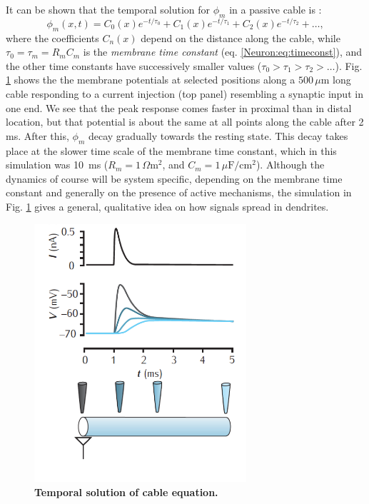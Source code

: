 \subsubsection{}
\label{sec:Neuron:cabletemp}
It can be shown that the temporal solution for $\phi_m$ in a passive cable is \cite{rall1969}:
\begin{equation}
\phi_m(x,t) = C_0(x) e^{-t/\tau_0} + C_1(x) e^{-t/\tau_1} + C_2(x) e^{-t/\tau_2} + \ldots, 
\label{Neuron:eq:cabletemporal}
\end{equation}
where the coefficients $C_n(x)$ depend on the distance along the cable, while $\tau_0 = \tau_m = R_m C_m$ is the \emph{membrane time constant} (eq. \ref{Neuron:eq:timeconst}), and the other time constants have successively smaller values ($\tau_0 > \tau_1 > \tau_2 > \ldots$). Fig. \ref{Neuron:fig:temporalrall} shows the the membrane potentials at selected positions along a $500 \, \mu$m long cable responding to a current injection (top panel) resembling a synaptic input in one end. We see that the peak response comes faster in proximal than in distal location, but that potential is about the same at all points along the cable after 2 ms. After this, $\phi_m$  decay gradually towards the resting state. This decay takes place at the slower time scale of the membrane time constant, which in this simulation was 10~ms ($R_m=1\,\Omega \text{m}^2$, and $C_m=1\,\mu\text{F}/\text{cm}^2$). Although the dynamics of course will be system specific, depending on the membrane time constant and generally on the presence of active mechanisms, the simulation in Fig. \ref{Neuron:fig:temporalrall} gives a general, qualitative idea on how signals spread in dendrites.

\begin{figure}[!ht]
\begin{center}
\includegraphics[width=0.7\textwidth]{Figures/Neuron/Temporalcable.png}
\end{center}
\caption{\textbf{Temporal solution of cable equation.}
}
\label{Neuron:fig:temporalrall}
\end{figure}

